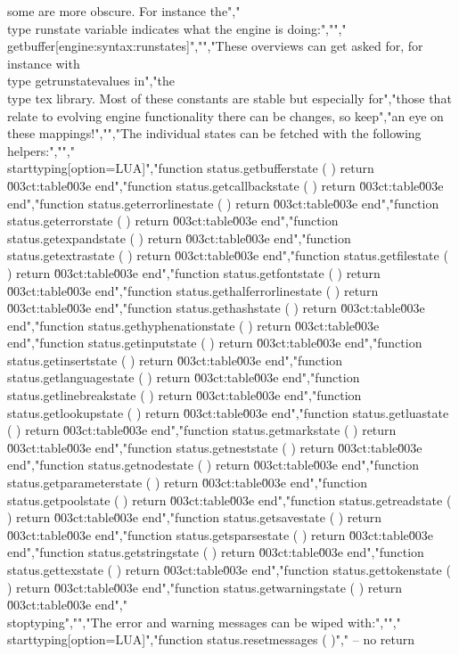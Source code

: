 some are more obscure. For instance the","\\type {runstate} variable indicates what the engine is doing:","","\\getbuffer[engine:syntax:runstates]","","These overviews can get asked for, for instance with \\type {getrunstatevalues} in","the \\type {tex} library. Most of these constants are stable but especially for","those that relate to evolving engine functionality there can be changes, so keep","an eye on these mappings!","","The individual states can be fetched with the following helpers:","","\\starttyping[option=LUA]","function status.getbufferstate        ( ) return \u003ct:table\u003e end","function status.getcallbackstate      ( ) return \u003ct:table\u003e end","function status.geterrorlinestate     ( ) return \u003ct:table\u003e end","function status.geterrorstate         ( ) return \u003ct:table\u003e end","function status.getexpandstate        ( ) return \u003ct:table\u003e end","function status.getextrastate         ( ) return \u003ct:table\u003e end","function status.getfilestate          ( ) return \u003ct:table\u003e end","function status.getfontstate          ( ) return \u003ct:table\u003e end","function status.gethalferrorlinestate ( ) return \u003ct:table\u003e end","function status.gethashstate          ( ) return \u003ct:table\u003e end","function status.gethyphenationstate   ( ) return \u003ct:table\u003e end","function status.getinputstate         ( ) return \u003ct:table\u003e end","function status.getinsertstate        ( ) return \u003ct:table\u003e end","function status.getlanguagestate      ( ) return \u003ct:table\u003e end","function status.getlinebreakstate     ( ) return \u003ct:table\u003e end","function status.getlookupstate        ( ) return \u003ct:table\u003e end","function status.getluastate           ( ) return \u003ct:table\u003e end","function status.getmarkstate          ( ) return \u003ct:table\u003e end","function status.getneststate          ( ) return \u003ct:table\u003e end","function status.getnodestate          ( ) return \u003ct:table\u003e end","function status.getparameterstate     ( ) return \u003ct:table\u003e end","function status.getpoolstate          ( ) return \u003ct:table\u003e end","function status.getreadstate          ( ) return \u003ct:table\u003e end","function status.getsavestate          ( ) return \u003ct:table\u003e end","function status.getsparsestate        ( ) return \u003ct:table\u003e end","function status.getstringstate        ( ) return \u003ct:table\u003e end","function status.gettexstate           ( ) return \u003ct:table\u003e end","function status.gettokenstate         ( ) return \u003ct:table\u003e end","function status.getwarningstate       ( ) return \u003ct:table\u003e end","\\stoptyping","","The error and warning messages can be wiped with:","","\\starttyping[option=LUA]","function status.resetmessages ( )","    -- no return 